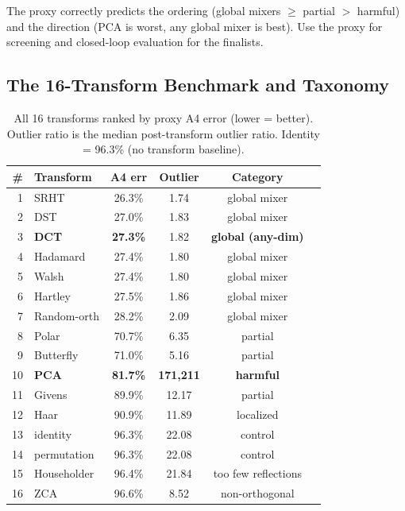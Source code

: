 \documentclass[conference]{IEEEtran}
\begin{document}
The proxy correctly predicts the ordering (global mixers $\geq$ partial $>$ harmful) and
the direction (PCA is worst, any global mixer is best). Use the proxy for screening and
closed-loop evaluation for the finalists.

\subsection{The 16-Transform Benchmark and Taxonomy}
\label{sec:zoo}

\begin{table}[t]\centering\small
\caption{All 16 transforms ranked by proxy A4 error (lower = better). Outlier ratio is
the median post-transform outlier ratio. Identity = 96.3\% (no transform baseline).}
\label{tab:zoo}
\begin{tabular}{rlcccl}
\toprule
\# & Transform & A4 err & Outlier & Category \\
\midrule
1  & SRHT        & 26.3\% & 1.74 & global mixer \\
2  & DST         & 27.0\% & 1.83 & global mixer \\
3  & \textbf{DCT}& \textbf{27.3\%} & 1.82 & \textbf{global (any-dim)} \\
4  & Hadamard    & 27.4\% & 1.80 & global mixer \\
5  & Walsh       & 27.4\% & 1.80 & global mixer \\
6  & Hartley     & 27.5\% & 1.86 & global mixer \\
7  & Random-orth & 28.2\% & 2.09 & global mixer \\
\midrule
8  & Polar       & 70.7\% & 6.35 & partial \\
9  & Butterfly   & 71.0\% & 5.16 & partial \\
\midrule
10 & \textbf{PCA}& \textbf{81.7\%} & \textbf{171,211} & \textbf{harmful} \\
11 & Givens      & 89.9\% & 12.17 & partial \\
12 & Haar        & 90.9\% & 11.89 & localized \\
13 & identity    & 96.3\% & 22.08 & control \\
14 & permutation & 96.3\% & 22.08 & control \\
15 & Householder & 96.4\% & 21.84 & too few reflections \\
16 & ZCA         & 96.6\% & 8.52 & non-orthogonal \\
\bottomrule
\end{tabular}
\end{table}
\end{document}

